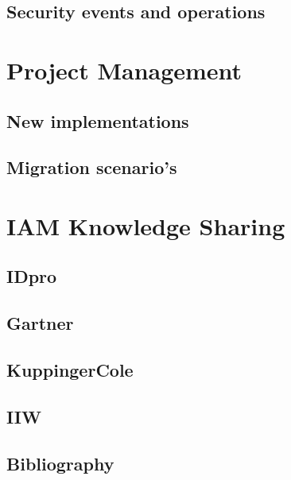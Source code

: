 \hypertarget{security-events-and-operations}{%
\section{Security events and
operations}\label{security-events-and-operations}}

\hypertarget{project-management}{%
\chapter{Project Management}\label{project-management}}

\hypertarget{new-implementations}{%
\section{New implementations}\label{new-implementations}}

\hypertarget{migration-scenarios}{%
\section{Migration scenario's}\label{migration-scenarios}}

\hypertarget{iam-knowledge-sharing}{%
\chapter{IAM Knowledge Sharing}\label{iam-knowledge-sharing}}

\hypertarget{idpro}{%
\section{IDpro}\label{idpro}}

\hypertarget{gartner}{%
\section{Gartner}\label{gartner}}

\hypertarget{kuppingercole}{%
\section{KuppingerCole}\label{kuppingercole}}

\hypertarget{iiw}{%
\section{IIW}\label{iiw}}

\hypertarget{bibliography}{%
\section{Bibliography}\label{bibliography}}
